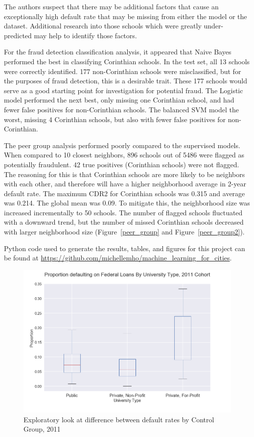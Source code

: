 \documentclass[10pt,twocolumn]{article}
\begin{document}
The authors suspect that there may be additional factors that cause an exceptionally
high default rate that may be missing from either the model or the dataset. Additional
research into those schools which were greatly under-predicted may help to identify
those factors.

For the fraud detection classification analysis, it appeared that Naive Bayes performed
the best in classifying Corinthian schools. In the test set, all 13 schools were correctly
identified. 177 non-Corinthian schools were misclassified, but for the purposes of fraud
detection, this is a desirable trait. These 177 schools would serve as a good starting
point for investigation for potential fraud. The Logistic model performed the next best,
only missing one Corinthian school, and had fewer false positives for non-Corinthian schools.
The balanced SVM model the worst, missing 4 Corinthian schools, but also with fewer
false positives for non-Corinthian.

The peer group analysis performed poorly compared to the supervised models. When compared to 10 closest
neighbors, 896 schools out of 5486 were flagged as potentially fraudulent. 42
true positives (Corinthian schools) were not flagged. The reasoning for this is that
Corinthian schools are more likely to be neighbors with each other, and therefore will
have a higher neighborhood average in 2-year default rate. The maximum CDR2 for
Corinthian schools was 0.315 and average was 0.214. The global mean was 0.09. To mitigate this,
the neighborhood size was increased incrementally to 50 schools. The number of flagged schools
fluctuated with a downward trend, but the number of missed Corinthian schools decreased with larger
neighborhood size (Figure~\ref{peer_group} and Figure~\ref{peer_group2}).

Python code used to generate the results, tables, and figures for this project can be
found at \url{https://github.com/michellemho/machine_learning_for_cities}.


\begin{figure}[!t]
  \begin{center}
    \includegraphics[width=\textwidth]{fedloans.png}
  \end{center}

  \caption{\Figure Exploratory look at difference between default rates by Control Group, 2011}
  \label{boxplot}
\end{figure}
\end{document}
